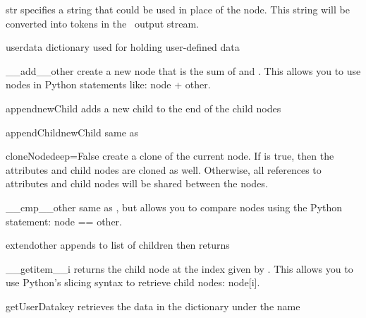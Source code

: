 \begin{memberdesc}[Node]{str}
specifies a string that could be used in place of the node.
This string will be converted into tokens in the \plasTeX\ 
output stream.
\end{memberdesc}

\begin{memberdesc}[Node]{userdata}
dictionary used for holding user-defined data
\end{memberdesc}


\begin{methoddesc}[Node]{__add__}{other}
create a new node that is the sum of  and .  This
allows you to use nodes in Python statements like: node + other.
\end{methoddesc}

\begin{methoddesc}[Node]{append}{newChild}
adds a new child to the end of the child nodes
\end{methoddesc}

\begin{methoddesc}[Node]{appendChild}{newChild}
same as 
\end{methoddesc}

\begin{methoddesc}[Node]{cloneNode}{deep=False}
create a clone of the current node.  If  is true, then the 
attributes and child nodes are cloned as well.  Otherwise, all references
to attributes and child nodes will be shared between the nodes.
\end{methoddesc}

\begin{methoddesc}[Node]{__cmp__}{other}
same as , but allows you to compare nodes using the
Python statement: node == other.
\end{methoddesc}

\begin{methoddesc}[Node]{extend}{other}
appends  to list of children then returns 
\end{methoddesc}

\begin{methoddesc}[Node]{__getitem__}{i}
returns the child node at the index given by .  This allows you to
use Python's slicing syntax to retrieve child nodes: node[i].
\end{methoddesc}

\begin{methoddesc}[Node]{getUserData}{key}
retrieves the data in the  dictionary under the name 
\end{methoddesc}

